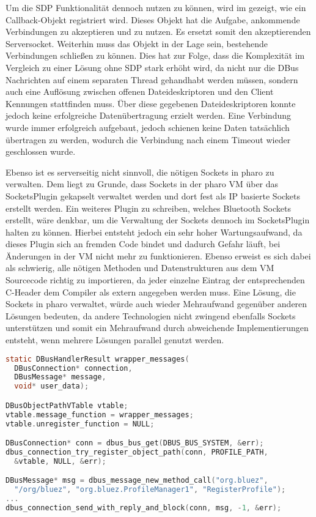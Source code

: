        Um die SDP Funktionalität dennoch nutzen zu können, wird im  gezeigt, wie ein Callback-Objekt registriert wird. Dieses Objekt hat die Aufgabe, ankommende Verbindungen zu akzeptieren und zu nutzen. Es ersetzt somit den akzeptierenden Serversocket. Weiterhin muss das Objekt in der Lage sein, bestehende Verbindungen schließen zu können. Dies hat zur Folge, dass die Komplexität im Vergleich zu einer Lösung ohne SDP stark erhöht wird, da nicht nur die DBus Nachrichten auf einem separaten Thread gehandhabt werden müssen, sondern auch eine Auflösung zwischen offenen Dateideskriptoren und den Client Kennungen stattfinden muss.
        Über diese gegebenen Dateideskriptoren konnte jedoch keine erfolgreiche Datenübertragung erzielt werden. Eine Verbindung wurde immer erfolgreich aufgebaut, jedoch schienen keine Daten tatsächlich übertragen zu werden, wodurch die Verbindung nach einem Timeout wieder geschlossen wurde.
        
        Ebenso ist es serverseitig nicht sinnvoll, die nötigen Sockets in pharo zu verwalten. Dem liegt zu Grunde, dass Sockets in der pharo VM über das SocketsPlugin \cite{pharoSocket} gekapselt verwaltet werden und dort fest als IP basierte Sockets erstellt werden. Ein weiteres Plugin zu schreiben, welches Bluetooth Sockets erstellt, wäre denkbar, um die Verwaltung der Sockets dennoch im SocketsPlugin halten zu können. Hierbei entsteht jedoch ein sehr hoher Wartungsaufwand, da dieses Plugin sich an fremden Code bindet und dadurch Gefahr läuft, bei Änderungen in der VM nicht mehr zu funktionieren. Ebenso erweist es sich dabei als schwierig, alle nötigen Methoden und Datenstrukturen aus dem VM Sourcecode richtig zu importieren, da jeder einzelne Eintrag der entsprechenden C-Header dem Compiler als extern angegeben werden muss.
        Eine Lösung, die Sockets in pharo verwaltet, würde auch wieder Mehraufwand gegenüber anderen Lösungen bedeuten, da andere Technologien nicht zwingend ebenfalls Sockets unterstützen und somit ein Mehraufwand durch abweichende Implementierungen entsteht, wenn mehrere Lösungen parallel genutzt werden.
        
        \begin{lstlisting}[frame=bt, label={lst:bluetooth:dbus}, language=C, caption=DBus Nutzung von SDP (Servercode in C)]
static DBusHandlerResult wrapper_messages(
  DBusConnection* connection,
  DBusMessage* message,
  void* user_data);

DBusObjectPathVTable vtable;
vtable.message_function = wrapper_messages;
vtable.unregister_function = NULL;              

DBusConnection* conn = dbus_bus_get(DBUS_BUS_SYSTEM, &err);
dbus_connection_try_register_object_path(conn, PROFILE_PATH,
  &vtable, NULL, &err);

DBusMessage* msg = dbus_message_new_method_call("org.bluez",
  "/org/bluez", "org.bluez.ProfileManager1", "RegisterProfile");
...
dbus_connection_send_with_reply_and_block(conn, msg, -1, &err);
        \end{lstlisting}        
        
